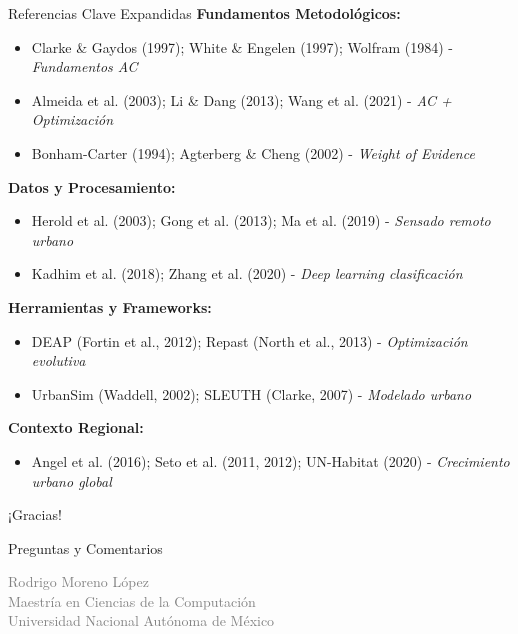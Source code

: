 \documentclass[aspectratio=169]{beamer}
\begin{document}
\appendix
\begin{frame}{Referencias Clave Expandidas}
  \footnotesize
  \textbf{Fundamentos Metodológicos:}
  \begin{itemize}
    \item Clarke \& Gaydos (1997); White \& Engelen (1997); Wolfram (1984) - \emph{Fundamentos AC}
    \item Almeida et al. (2003); Li \& Dang (2013); Wang et al. (2021) - \emph{AC + Optimización}
    \item Bonham-Carter (1994); Agterberg \& Cheng (2002) - \emph{Weight of Evidence}
  \end{itemize}
  
  \textbf{Datos y Procesamiento:}  
  \begin{itemize}
    \item Herold et al. (2003); Gong et al. (2013); Ma et al. (2019) - \emph{Sensado remoto urbano}
    \item Kadhim et al. (2018); Zhang et al. (2020) - \emph{Deep learning clasificación}
  \end{itemize}
  
  \textbf{Herramientas y Frameworks:}
  \begin{itemize}
    \item DEAP (Fortin et al., 2012); Repast (North et al., 2013) - \emph{Optimización evolutiva}  
    \item UrbanSim (Waddell, 2002); SLEUTH (Clarke, 2007) - \emph{Modelado urbano}
  \end{itemize}
  
  \textbf{Contexto Regional:}
  \begin{itemize}
    \item Angel et al. (2016); Seto et al. (2011, 2012); UN-Habitat (2020) - \emph{Crecimiento urbano global}
  \end{itemize}
\end{frame}

\begin{frame}[plain]
  \Huge ¡Gracias!
  
  \vspace{0.5cm}
  \Large Preguntas y Comentarios
  
  \vspace{0.3cm}
  \normalsize
  \textcolor{gray}{
  Rodrigo Moreno López \\
  Maestría en Ciencias de la Computación \\
  Universidad Nacional Autónoma de México
  }
\end{frame}
\end{document}
